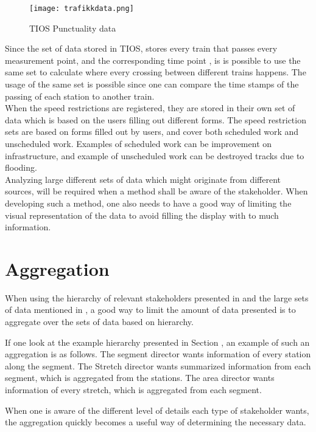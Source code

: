 \begin{figure}[!htbp]
	\texttt{[image: trafikkdata.png]}
	\caption[TIOS Punctuality data]{TIOS Punctuality data \cite{sintefPresis}}
	\label{fig:jernbaneverket-trafikkdata}
\end{figure}

Since the set of data stored in TIOS, stores every train that passes every 
measurement point, and the corresponding time point , is is possible
to use the same set to calculate where every crossing between different trains
happens. The usage of the same set is possible since one can compare the time 
stamps of the passing of each station to another train.\\

When the speed restrictions are registered, they are stored in their own set of
data which is based on the users filling out different forms. The speed
restriction sets are based on forms filled out by users, and cover both
scheduled work and unscheduled work. Examples of scheduled work can be
improvement on infrastructure, and example of unscheduled work can be destroyed
tracks due to flooding. \\

Analyzing large different sets of data which might originate from different
sources, will be required when a method shall be aware of the stakeholder.
When developing such a method, one also needs to have a good way of limiting
the visual representation of the data to avoid filling the display with to much
information.

\section{Aggregation} %
\label{sec:back_aggregation}

When using the hierarchy of relevant stakeholders presented in 
and the large sets of data mentioned in , a
good way to limit the amount of data presented is to aggregate over the sets of
data based on hierarchy.

If one look at the example hierarchy presented in Section
, an example of such an aggregation is as
follows. The segment director wants information of every station along the
segment. The Stretch director wants summarized information from each segment, which is
aggregated from the stations. The area director wants information of every
stretch, which is aggregated from each segment.

When one is aware of the different level of details each type of stakeholder
wants, the aggregation quickly becomes a useful way of determining the
necessary data.

